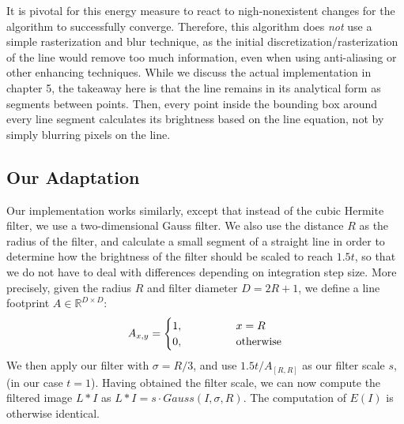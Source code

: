 It is pivotal for this energy measure to react to nigh-nonexistent changes for the algorithm to successfully converge.
Therefore, this algorithm does \textit{not} use a simple rasterization and blur technique, as the initial discretization/rasterization
of the line would remove too much information, even when using anti-aliasing or other enhancing techniques.
While we discuss the actual implementation in chapter 5, the takeaway here is that the line remains in its analytical form as segments between points.
Then, every point inside the bounding box around every line segment calculates its brightness based on the line equation, not by simply blurring pixels on the line.

\subsection{Our Adaptation}
\noindent Our implementation works similarly, except that instead of the cubic Hermite filter, we use a two-dimensional Gauss filter.
We also use the distance $R$ as the radius of the filter, and calculate a small segment of a straight line in order to determine
how the brightness of the filter should be scaled to reach $1.5t$, so that we do not have to deal with differences depending on integration step size. 
More precisely, given the radius $R$ and filter diameter $D=2R+1$, we define a line footprint $A \in \mathbb{R}^{D\times D}$:
\begin{equation*}
    A_{x,y} = \begin{cases}
        1, \kern4em & x = R\\
        0, \kern4em & \text{otherwise}
    \end{cases}
\end{equation*}
We then apply our filter with $\sigma = R/3$, and use $1.5t  / A_{[R,R]}$ as our filter scale $s$, (in our case $t=1$).
Having obtained the filter scale, we can now compute the filtered image $L\ast I$ as $L\ast I = s \cdot Gauss(I, \sigma, R)$.
The computation of $E(I)$ is otherwise identical.


